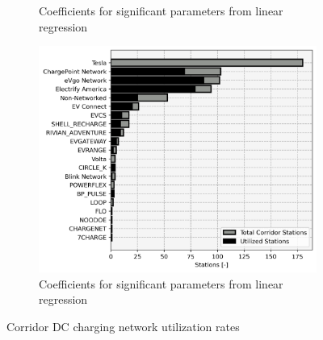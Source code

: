 \begin{figure}[H]
\begin{subfigure}{\linewidth/3}
	\caption{Coefficients for significant parameters from linear regression}
\end{subfigure}%
\begin{subfigure}{\linewidth/3}
	\centering\captionsetup{width = .8\linewidth}
	\includegraphics[width = \linewidth]{figs/corridor_station_utilization_2.png}
	\caption{Coefficients for significant parameters from linear regression}
\end{subfigure}

\caption{Corridor DC charging network utilization rates}
\label{fig:utilization_rates}

\end{figure}

